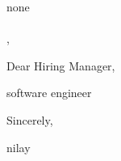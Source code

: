 \documentclass[11pt,a4paper]{letter}
\begin{document}
\begin{letter}{
none\\
\\
, 
}

\address{
nilay\\
\\
, \\
9016989674\\
\href{mailto:nilaypatel@gmail.com}{nilaypatel@gmail.com}
}

\date{April 14, 2025}

\opening{Dear Hiring Manager,}

software engineer



\closing{Sincerely,}

\vspace{0.5in}
nilay

\end{letter}
\end{document}
